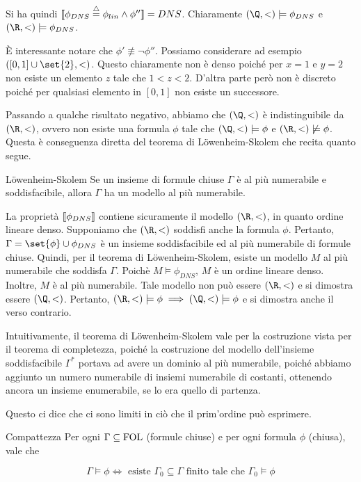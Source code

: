 Si ha quindi \(\den{\phi_{DNS} \eqdef\phi_{lin} \land \phi''} = DNS\). Chiaramente \((\Q,<)\models \phi_{DNS}\) e \((\R,<)\models \phi_{DNS}\).

È interessante notare che \(\phi'\not\equiv\neg \phi''\). Possiamo considerare ad esempio \(([0,1]\cup \set{2},<)\). Questo chiaramente non è denso poiché per \(x = 1\) e \(y = 2\) non esiste un elemento \(z\) tale che \(1 < z < 2\). D'altra parte però non è discreto poiché per qualsiasi elemento in \([0,1]\) non esiste un successore. 

Passando a qualche risultato negativo, abbiamo che \((\Q,<)\) è indistinguibile da \((\R,<)\), ovvero non esiste una formula \(\phi\) tale che \((\Q,<)\models \phi\) e \((\R,<)\not\models \phi\). Questa è conseguenza diretta del teorema di Löwenheim-Skolem che recita quanto segue.
\begin{theorem}{Löwenheim-Skolem}
  Se un insieme di formule chiuse \(\Gamma\) è al più numerabile e soddisfacibile, allora \(\Gamma\) ha un modello al più numerabile.
\end{theorem}

La proprietà \(\den{\phi_{DNS}}\) contiene sicuramente il modello \((\R,<)\), in quanto ordine lineare denso. Supponiamo che \((\R,<)\) soddisfi anche la formula \(\phi\). Pertanto, \(\Gamma = \set{\phi} \cup \phi_{DNS}\) è un insieme soddisfacibile ed al più numerabile di formule chiuse. Quindi, per il teorema di Löwenheim-Skolem, esiste un modello \(M\) al più numerabile che soddisfa \(\Gamma\). Poichè \(M\models \phi_{DNS}\), \(M\) è un ordine lineare denso. Inoltre, \(M\) è al più numerabile. Tale modello non può essere \((\R,<)\) e si dimostra essere \((\Q, <)\).
Pertanto, \((\R, <)\models \phi \implies (\Q, <)\models \phi\) e si dimostra anche il verso contrario.

Intuitivamente, il teorema di Löwenheim-Skolem vale per la costruzione vista per il teorema di completezza, poiché la costruzione del modello dell'insieme soddisfacibile \(\Gamma^*\) portava ad avere un dominio al più numerabile, poiché abbiamo aggiunto un numero numerabile di insiemi numerabile di costanti, ottenendo ancora un insieme enumerabile, se lo era quello di partenza.

Questo ci dice che ci sono limiti in ciò che il prim'ordine può esprimere.

\begin{theorem}{Compattezza}
  Per ogni \(\Gamma\subseteq\FOL\) (formule chiuse) e per ogni formula \(\phi\) (chiusa), vale che
  
  \[\Gamma \models \phi \iff \text{ esiste } \Gamma_0 \subseteq \Gamma \text{ finito tale che } \Gamma_0 \models \phi\]
\end{theorem}

